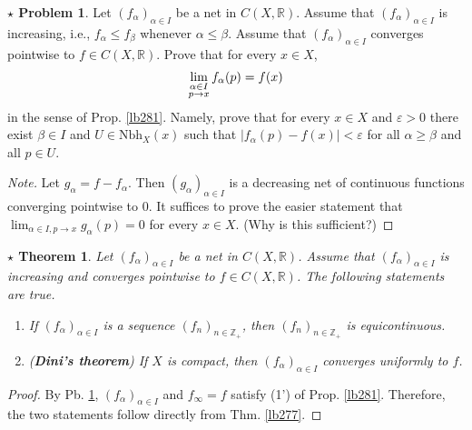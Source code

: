\documentclass[12pt,b5paper,notitlepage]{article}
\theoremstyle{definition}
\newtheorem{sprob}[prob]{\color{red}$\star$ Problem}
\theoremstyle{plain}
\newtheorem{sthm}[df]{$\star$ Theorem}
\newcommand{\Zbb}{\mathbb Z}
\newcommand{\Rbb}{\mathbb R}
\newcommand{\dps}{\displaystyle}
\newcommand{\Nbh}{\mathrm{Nbh}}
\newcommand{\eps}{\varepsilon}
\numberwithin{equation}{section}
\begin{document}
\begin{sprob}\label{lb285}
Let $(f_\alpha)_{\alpha\in I}$ be a net in $C(X,\Rbb)$. Assume that $(f_\alpha)_{\alpha\in I}$ is increasing, i.e., $f_\alpha\leq f_\beta$ whenever $\alpha\leq\beta$. Assume that $(f_\alpha)_{\alpha\in I}$ converges pointwise to $f\in C(X,\Rbb)$. Prove that for every $x\in X$,
\begin{align}
\lim_{
\begin{subarray}{c}
\alpha\in I\\
p\rightarrow x
\end{subarray}
}
f_\alpha(p)=f(x)
\end{align}
in the sense of Prop. \ref{lb281}. Namely, prove that for every $x\in X$ and $\eps>0$ there exist $\beta\in I$ and $U\in\Nbh_X(x)$ such that $|f_\alpha(p)-f(x)|<\eps$ for all $\alpha\geq\beta$ and all $p\in U$.
\end{sprob}

\begin{proof}[Note]
Let $g_\alpha=f-f_\alpha$. Then $(g_\alpha)_{\alpha\in I}$ is a decreasing net of continuous functions converging pointwise to $0$. It suffices to prove the easier statement that $\dps\lim_{\alpha\in I,p\rightarrow x}g_\alpha(p)=0$ for every $x\in X$. (Why is this sufficient?)
\end{proof}

\begin{sthm}\label{lb286}
Let $(f_\alpha)_{\alpha\in I}$ be a net in $C(X,\Rbb)$. Assume that $(f_\alpha)_{\alpha\in I}$ is increasing and converges pointwise to $f\in C(X,\Rbb)$. The following statements are true.
\begin{enumerate}
\item If $(f_\alpha)_{\alpha\in I}$ is a sequence $(f_n)_{n\in\Zbb_+}$, then $(f_n)_{n\in\Zbb_+}$ is equicontinuous.
\item (\textbf{Dini's theorem})  If $X$ is compact, then $(f_\alpha)_{\alpha\in I}$ converges uniformly to $f$.
\end{enumerate}
\end{sthm}


\begin{proof}
By Pb. \ref{lb285}, $(f_\alpha)_{\alpha\in I}$ and $f_\infty=f$ satisfy (1') of Prop. \ref{lb281}. Therefore, the two statements follow directly from Thm. \ref{lb277}.
\end{proof}
\end{document}
